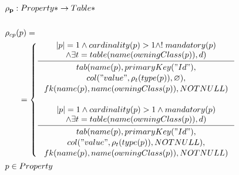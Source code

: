 \documentclass[11pt]{article}
\begin{document}
\begin{align*}
&	\mathbf{\rho_p} : Property* \rightarrow Table* \\ \\
&	\rho_{cp}(p) = \\
& \;\;\;\;\;\; =\begin{cases}
     	\inference{|p| = 1 \wedge cardinality(p) > 1 \wedge !\;mandatory(p) \\ 
     		\wedge 	\exists t = table(name(owningClass(p)), d)
     		}{\begin{gathered}
     			tab(name(p), primaryKey("Id"), \\ col("value", \rho_t(type(p)), \varnothing), \\ fk(name(p), 			name(owningClass(p)), NOTNULL) \\
    	\end{gathered}}\\ \\
     	\inference{|p| = 1 \wedge  cardinality(p) > 1 \wedge mandatory(p) \\ 
     		\wedge \exists t = table(name(owningClass(p)), d) 
     		}{\begin{gathered}  
     			tab(name(p), primaryKey("Id"), \\ 
     			col("value", \rho_t(type(p)), NOTNULL), \\ 			fk(name(p), name(owningClass(p)), NOTNULL)
    	 \end{gathered}}
 	\end{cases}\\
& 	p \in Property
\end{align*}
\end{document}
